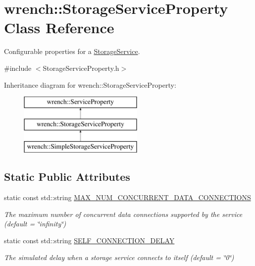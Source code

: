 \hypertarget{classwrench_1_1_storage_service_property}{}\section{wrench\+:\+:Storage\+Service\+Property Class Reference}
\label{classwrench_1_1_storage_service_property}


Configurable properties for a \hyperlink{classwrench_1_1_storage_service}{Storage\+Service}.  




{\ttfamily \#include $<$Storage\+Service\+Property.\+h$>$}

Inheritance diagram for wrench\+:\+:Storage\+Service\+Property\+:\begin{figure}[H]
\begin{center}
\leavevmode
\includegraphics[height=3.000000cm]{classwrench_1_1_storage_service_property}
\end{center}
\end{figure}
\subsection*{Static Public Attributes}
\begin{DoxyCompactItemize}
\item 
\mbox{\label{classwrench_1_1_storage_service_property_ab2baa8ffec1446295537e1ecbbc2c905}} 
static const std\+::string \hyperlink{classwrench_1_1_storage_service_property_ab2baa8ffec1446295537e1ecbbc2c905}{M\+A\+X\+\_\+\+N\+U\+M\+\_\+\+C\+O\+N\+C\+U\+R\+R\+E\+N\+T\+\_\+\+D\+A\+T\+A\+\_\+\+C\+O\+N\+N\+E\+C\+T\+I\+O\+NS}
\begin{DoxyCompactList}\small\item\em The maximum number of concurrent data connections supported by the service (default = \char`\"{}infinity\char`\"{}) \end{DoxyCompactList}\item 
\mbox{\label{classwrench_1_1_storage_service_property_a790fa186d5ab598609d279b15fe8926b}} 
static const std\+::string \hyperlink{classwrench_1_1_storage_service_property_a790fa186d5ab598609d279b15fe8926b}{S\+E\+L\+F\+\_\+\+C\+O\+N\+N\+E\+C\+T\+I\+O\+N\+\_\+\+D\+E\+L\+AY}
\begin{DoxyCompactList}\small\item\em The simulated delay when a storage service connects to itself (default = \char`\"{}0\char`\"{}) \end{DoxyCompactList}\end{DoxyCompactItemize}


